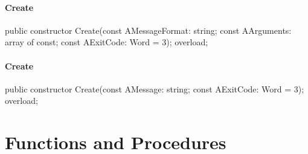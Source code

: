\documentclass{report}
\newif\ifpdf
\begin{document}
\paragraph*{Create}\hspace*{\fill}

\label{PasDoc_Types.EPasDoc-Create}
\begin{list}{}{
\setlength{\itemindent}{0cm}
\setlength{\listparindent}{0cm}
\setlength{\leftmargin}{\evensidemargin}
\addtolength{\leftmargin}{\tmplength}
\settowidth{\labelsep}{X}
\addtolength{\leftmargin}{\labelsep}
\setlength{\labelwidth}{\tmplength}
}
\item[\textbf{Declaration}\hfill]
\ifpdf
\begin{flushleft}
\fi
\begin{ttfamily}
public constructor Create(const AMessageFormat: string; const AArguments: array of const; const AExitCode: Word = 3); overload;\end{ttfamily}

\ifpdf
\end{flushleft}
\fi

\end{list}
\paragraph*{Create}\hspace*{\fill}

\label{PasDoc_Types.EPasDoc-Create}
\begin{list}{}{
\setlength{\itemindent}{0cm}
\setlength{\listparindent}{0cm}
\setlength{\leftmargin}{\evensidemargin}
\addtolength{\leftmargin}{\tmplength}
\settowidth{\labelsep}{X}
\addtolength{\leftmargin}{\labelsep}
\setlength{\labelwidth}{\tmplength}
}
\item[\textbf{Declaration}\hfill]
\ifpdf
\begin{flushleft}
\fi
\begin{ttfamily}
public constructor Create(const AMessage: string; const AExitCode: Word = 3); overload;\end{ttfamily}

\ifpdf
\end{flushleft}
\fi

\end{list}
\section{Functions and Procedures}
\ifpdf
\end{document}
